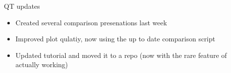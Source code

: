 \begin{frame}{QT updates}
\begin{itemize}
\item Created several comparison presenations last week
\item Improved plot qulatiy, now using the up to date comparison script
\item Updated tutorial and moved it to a repo (now with the rare feature of actually working)
\end{itemize}
\end{frame}